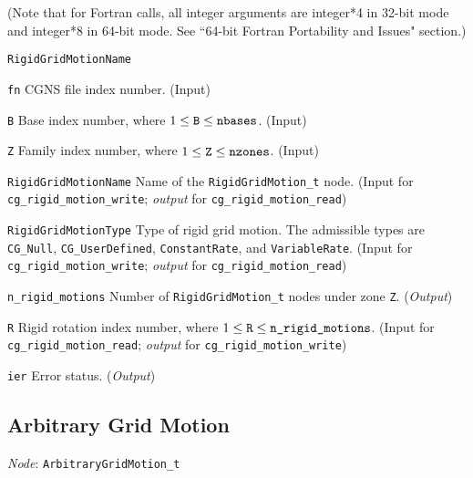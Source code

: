 \noindent (Note that for Fortran calls, all integer arguments are integer*4 in 32-bit mode and integer*8 in 64-bit mode.
See ``64-bit Fortran Portability and Issues" section.)

\begin{Ventryi}{\texttt{RigidGridMotionName}}\raggedright
\item [\texttt{fn}]
      CGNS file index number.
      (\textcolor{input}{Input})
\item [\texttt{B}]
      Base index number, where $1 \leq \text{\texttt{B}} \leq \text{\texttt{nbases}}$.
      (\textcolor{input}{Input})
\item [\texttt{Z}]
      Family index number, where $1 \leq \text{\texttt{Z}} \leq \text{\texttt{nzones}}$.
      (\textcolor{input}{Input})
\item [\texttt{RigidGridMotionName}]
      Name of the \texttt{RigidGridMotion\_t} node.
      (\textcolor{input}{Input} for \texttt{cg\_rigid\_motion\_write};
      \textcolor{output}{\textit{output}} for \texttt{cg\_rigid\_motion\_read})
\item [\texttt{RigidGridMotionType}]
      Type of rigid grid motion.
      The admissible types are \texttt{CG\_Null}, \texttt{CG\_UserDefined},
      \texttt{ConstantRate}, and \texttt{VariableRate}.
      (\textcolor{input}{Input} for \texttt{cg\_rigid\_motion\_write};
      \textcolor{output}{\textit{output}} for \texttt{cg\_rigid\_motion\_read})
\item [\texttt{n\_rigid\_motions}]
      Number of \texttt{RigidGridMotion\_t} nodes under zone \texttt{Z}.
      (\textcolor{output}{\textit{Output}})
\item [\texttt{R}]
      Rigid rotation index number, where $1 \leq \text{\texttt{R}} \leq \text{\texttt{n\_rigid\_motions}}$.
      (\textcolor{input}{Input} for \texttt{cg\_rigid\_motion\_read};
      \textcolor{output}{\textit{output}} for \texttt{cg\_rigid\_motion\_write})
\item [\texttt{ier}]
      Error status.
      (\textcolor{output}{\textit{Output}})
\end{Ventryi}

\newpage
\subsection{Arbitrary Grid Motion}
\label{s:arbitrary}

\noindent
\textit{Node}: \texttt{ArbitraryGridMotion\_t}

